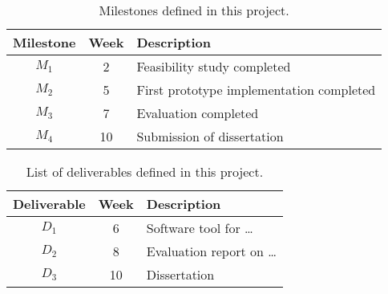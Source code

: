 \documentclass[a4paper,11pt]{article}
\begin{document}
\begin{table}[htbp]
    \begin{center}
        \begin{tabular}{|c|c|l|}
        \hline
        \textbf{Milestone} & \textbf{Week} & \textbf{Description} \\
        \hline
        $M_1$ & 2 & Feasibility study completed \\
        $M_2$ & 5 & First prototype implementation completed \\
        $M_3$ & 7 & Evaluation completed \\
        $M_4$ & 10 & Submission of dissertation \\
        \hline
        \end{tabular} 
    \end{center}
    \caption{Milestones defined in this project.}
    \label{fig:milestones}
\end{table}

\begin{table}[htbp]
    \begin{center}
        \begin{tabular}{|c|c|l|}
        \hline
        \textbf{Deliverable} & \textbf{Week} & \textbf{Description} \\
        \hline
        $D_1$ & 6 & Software tool for \dots\\
        $D_2$ & 8 & Evaluation report on \dots\\
        $D_3$ & 10 & Dissertation \\
        \hline
        \end{tabular} 
    \end{center}
    \caption{List of deliverables defined in this project.}
    \label{fig:deliverables}
\end{table}



{\small
}
\end{document}
